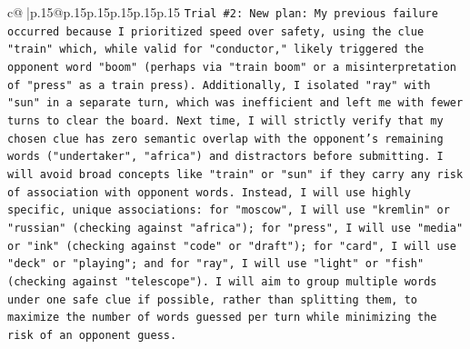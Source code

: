 \documentclass{article}
\begin{document}
{\begin{supertabular}{c@{$\;$}|p{.15\linewidth}@{}p{.15\linewidth}p{.15\linewidth}p{.15\linewidth}p{.15\linewidth}p{.15\linewidth}}
{{{\texttt{Trial \#2: New plan: My previous failure occurred because I prioritized speed over safety, using the clue "train" which, while valid for "conductor," likely triggered the opponent word "boom" (perhaps via "train boom" or a misinterpretation of "press" as a train press). Additionally, I isolated "ray" with "sun" in a separate turn, which was inefficient and left me with fewer turns to clear the board. Next time, I will strictly verify that my chosen clue has zero semantic overlap with the opponent's remaining words ("undertaker", "africa") and distractors before submitting. I will avoid broad concepts like "train" or "sun" if they carry any risk of association with opponent words. Instead, I will use highly specific, unique associations: for "moscow", I will use "kremlin" or "russian" (checking against "africa"); for "press", I will use "media" or "ink" (checking against "code" or "draft"); for "card", I will use "deck" or "playing"; and for "ray", I will use "light" or "fish" (checking against "telescope"). I will aim to group multiple words under one safe clue if possible, rather than splitting them, to maximize the number of words guessed per turn while minimizing the risk of an opponent guess.} \\
\\ 
}}}
\end{supertabular}}
\end{document}
